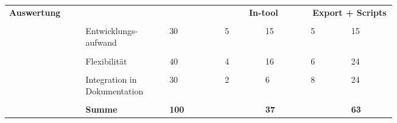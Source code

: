\documentclass[main.tex]{subfiles} %
\begin{document}
\begin{table}[H]
\begin{tabular}{|p{0.14\linewidth}|p{0.15\linewidth}|p{0.115\linewidth}|p{0.08\linewidth}|p{0.09\linewidth}|p{0.08\linewidth}|p{0.09\linewidth}|}
        \multirow{5}{4em}{\textbf{Auswertung}}             & \multicolumn{2}{c|}{}               & \multicolumn{2}{c|}{\textbf{In-tool}}        & \multicolumn{2}{c|}{\textbf{Export + Scripts}}                                          \\[1pt]
        \cline{2-7}
                                                           &                                     &                                              &                                                &             &            &             \\[-9pt]
                                                           & Entwicklungs-aufwand                & 30                                           & 5                                              & 15          & 5          & 15          \\[1pt]
        \cline{2-7}
                                                           &                                     &                                              &                                                &             &            &             \\[-9pt]
                                                           & Flexibilität                        & 40                                           & 4                                              & 16          & 6          & 24          \\[1pt]
        \cline{2-7}
                                                           &                                     &                                              &                                                &             &            &             \\[-9pt]
                                                           & Integration in Dokumentation        & 30                                           & 2                                              & 6           & 8          & 24          \\[1pt]
        \cline{2-7}
                                                           &                                     &                                              &                                                &             &            &             \\[-9pt]
                                                           & \textbf{Summe}                      & \textbf{100}                                 &                                                & \textbf{37} &            & \textbf{63} \\[1pt]

\end{tabular}
\end{table}
\end{document}
